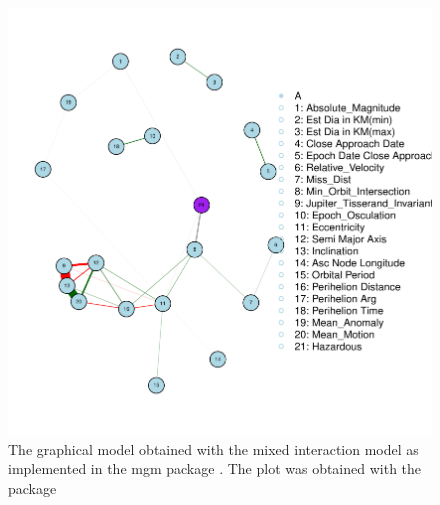 \documentclass[12pt,%
               a4paper,%
               oneside,openany,%
               titlepage,%
               headinclude,footinclude,%
               BCOR5mm,%
               cleardoublepage=empty,%
               tablecaptionabove,%
               floatperchapter,
               ]{scrreprt}                 %
\begin{document}
\begin{figure}[h]
\begin{center}
\includegraphics[width=1\textwidth]{Figures/mgm.pdf}
\caption{The graphical model obtained with the mixed interaction model as implemented in the mgm package \cite{mgm,haslbeck2015mgm}. The plot was obtained with the \cite{qgraph} package}
\label{mgm}
\end{center}
\end{figure}
\end{document}
